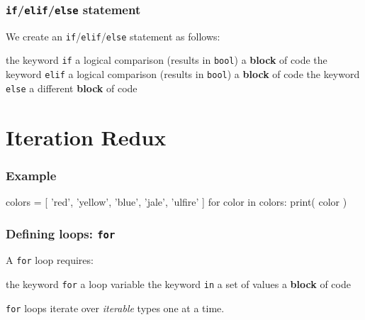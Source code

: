 \documentclass[11pt]{beamer}
\begin{document}
\begin{frame}[fragile]
  \frametitle{\texttt{if}/\texttt{elif}/\texttt{else} statement}
  \Enlarge

  \begin{itemize}
  \myitem  We create an \texttt{if}/\texttt{elif}/\texttt{else} statement as follows:
    \begin{itemize}
    \mysubitem  the keyword \texttt{if}
    \mysubitem  a logical comparison (results in \texttt{bool})
    \mysubitem  a \textbf{block} of code
    \mysubitem  the keyword \texttt{elif}
    \mysubitem  a logical comparison (results in \texttt{bool})
    \mysubitem  a \textbf{block} of code
    \mysubitem  the keyword \texttt{else}
    \mysubitem  a different \textbf{block} of code
    \end{itemize}
  \end{itemize}
\end{frame}

\section{Iteration Redux}

\begin{frame}[fragile]
  \frametitle{Example}
  \Enlarge

  \begin{semiverbatim}
colors = [ 'red', 'yellow', 'blue',
           'jale', 'ulfire' ]
for color in colors:
    print( color )
  \end{semiverbatim}
\end{frame}

\begin{frame}[fragile]
  \frametitle{Defining loops:  \texttt{for}}
  \Enlarge

  \begin{itemize}
  \myitem  A \texttt{for} loop requires:
    \begin{itemize}
    \mysubitem  the keyword \texttt{for}
    \mysubitem  a loop variable
    \mysubitem  the keyword \texttt{in}
    \mysubitem  a set of values
    \mysubitem  a \textbf{block} of code
    \end{itemize}
  \myitem  \texttt{for} loops iterate over \emph{iterable} types one at a time.
  \end{itemize}
\end{frame}
\end{document}
